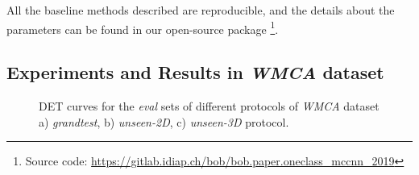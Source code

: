 \documentclass[journal]{IEEEtran}
\begin{document}
All the baseline methods described are reproducible, and the details about the parameters can be found in our open-source package \footnote{Source code: \url{https://gitlab.idiap.ch/bob/bob.paper.oneclass_mccnn_2019}}.


\subsection{Experiments and Results in \textit{WMCA} dataset}


\begin{figure*}[h!]
\centering
  \hfil
  \hfil
  \caption{DET curves for the \textit{eval} sets of different protocols of \textit{WMCA} dataset a) \textit{grandtest}, b) \textit{unseen-2D}, c) \textit{unseen-3D} protocol.}
 \label{fig:ROC}
\end{figure*}



\begin{table*}[h!]
\centering
\caption{Performance of the baseline systems and the proposed method in \textit{grandtest} protocol of \textit{WMCA} dataset. The values reported are obtained with a threshold computed for BPCER 1\% in $dev$ set.}
\label{tab:grandtest}
\end{table*}
\end{document}
